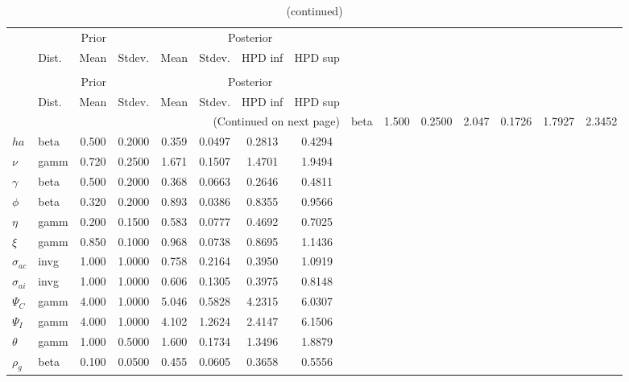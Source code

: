  
\begin{center}
\begin{longtable}{llcccccc} 
\caption{Results from Metropolis-Hastings (parameters)}
 \label{Table:MHPosterior:1}\\
\toprule 
  & \multicolumn{3}{c}{Prior}  &  \multicolumn{4}{c}{Posterior} \\
  \cmidrule(r{.75em}){2-4} \cmidrule(r{.75em}){5-8}
  & Dist. & Mean  & Stdev. & Mean & Stdev. & HPD inf & HPD sup\\
\midrule \endfirsthead 
\caption{(continued)}\\\toprule 
  & \multicolumn{3}{c}{Prior}  &  \multicolumn{4}{c}{Posterior} \\
  \cmidrule(r{.75em}){2-4} \cmidrule(r{.75em}){5-8}
  & Dist. & Mean  & Stdev. & Mean & Stdev. & HPD inf & HPD sup\\
\midrule \endhead 
\bottomrule \multicolumn{8}{r}{(Continued on next page)} \endfoot 
\bottomrule \endlastfoot 
${\sigma}$ & beta &   1.500 & 0.2500 &   2.047& 0.1726 &  1.7927 &  2.3452 \\ 
${ha}$ & beta &   0.500 & 0.2000 &   0.359& 0.0497 &  0.2813 &  0.4294 \\ 
$\nu$ & gamm &   0.720 & 0.2500 &   1.671& 0.1507 &  1.4701 &  1.9494 \\ 
$\gamma$ & beta &   0.500 & 0.2000 &   0.368& 0.0663 &  0.2646 &  0.4811 \\ 
${\phi}$ & beta &   0.320 & 0.2000 &   0.893& 0.0386 &  0.8355 &  0.9566 \\ 
${\eta}$ & gamm &   0.200 & 0.1500 &   0.583& 0.0777 &  0.4692 &  0.7025 \\ 
$\xi$ & gamm &   0.850 & 0.1000 &   0.968& 0.0738 &  0.8695 &  1.1436 \\ 
${\sigma_{ac}}$ & invg &   1.000 & 1.0000 &   0.758& 0.2164 &  0.3950 &  1.0919 \\ 
${\sigma_{ai}}$ & invg &   1.000 & 1.0000 &   0.606& 0.1305 &  0.3975 &  0.8148 \\ 
${\Psi_{C}}$ & gamm &   4.000 & 1.0000 &   5.046& 0.5828 &  4.2315 &  6.0307 \\ 
${\Psi_I}$ & gamm &   4.000 & 1.0000 &   4.102& 1.2624 &  2.4147 &  6.1506 \\ 
${\theta}$ & gamm &   1.000 & 0.5000 &   1.600& 0.1734 &  1.3496 &  1.8879 \\ 
${\rho_g}$ & beta &   0.100 & 0.0500 &   0.455& 0.0605 &  0.3658 &  0.5556 \\ 

\end{longtable}
\end{center}
